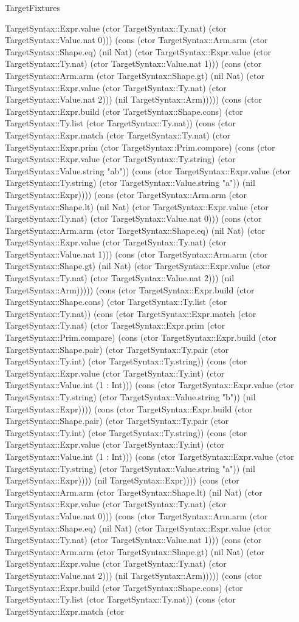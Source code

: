 \begin{lexlean}{TargetFixtures}
\begin{semanticmodule}
{TargetSyntax::Expr.value (ctor TargetSyntax::Ty.nat) (ctor TargetSyntax::Value.nat 0))) (cons (ctor TargetSyntax::Arm.arm (ctor TargetSyntax::Shape.eq) (nil Nat) (ctor TargetSyntax::Expr.value (ctor TargetSyntax::Ty.nat) (ctor TargetSyntax::Value.nat 1))) (cons (ctor TargetSyntax::Arm.arm (ctor TargetSyntax::Shape.gt) (nil Nat) (ctor TargetSyntax::Expr.value (ctor TargetSyntax::Ty.nat) (ctor TargetSyntax::Value.nat 2))) (nil TargetSyntax::Arm))))) (cons (ctor TargetSyntax::Expr.build (ctor TargetSyntax::Shape.cons) (ctor TargetSyntax::Ty.list (ctor TargetSyntax::Ty.nat)) (cons (ctor TargetSyntax::Expr.match (ctor TargetSyntax::Ty.nat) (ctor TargetSyntax::Expr.prim (ctor TargetSyntax::Prim.compare) (cons (ctor TargetSyntax::Expr.value (ctor TargetSyntax::Ty.string) (ctor TargetSyntax::Value.string "ab")) (cons (ctor TargetSyntax::Expr.value (ctor TargetSyntax::Ty.string) (ctor TargetSyntax::Value.string "a")) (nil TargetSyntax::Expr)))) (cons (ctor TargetSyntax::Arm.arm (ctor TargetSyntax::Shape.lt) (nil Nat) (ctor TargetSyntax::Expr.value (ctor TargetSyntax::Ty.nat) (ctor TargetSyntax::Value.nat 0))) (cons (ctor TargetSyntax::Arm.arm (ctor TargetSyntax::Shape.eq) (nil Nat) (ctor TargetSyntax::Expr.value (ctor TargetSyntax::Ty.nat) (ctor TargetSyntax::Value.nat 1))) (cons (ctor TargetSyntax::Arm.arm (ctor TargetSyntax::Shape.gt) (nil Nat) (ctor TargetSyntax::Expr.value (ctor TargetSyntax::Ty.nat) (ctor TargetSyntax::Value.nat 2))) (nil TargetSyntax::Arm))))) (cons (ctor TargetSyntax::Expr.build (ctor TargetSyntax::Shape.cons) (ctor TargetSyntax::Ty.list (ctor TargetSyntax::Ty.nat)) (cons (ctor TargetSyntax::Expr.match (ctor TargetSyntax::Ty.nat) (ctor TargetSyntax::Expr.prim (ctor TargetSyntax::Prim.compare) (cons (ctor TargetSyntax::Expr.build (ctor TargetSyntax::Shape.pair) (ctor TargetSyntax::Ty.pair (ctor TargetSyntax::Ty.int) (ctor TargetSyntax::Ty.string)) (cons (ctor TargetSyntax::Expr.value (ctor TargetSyntax::Ty.int) (ctor TargetSyntax::Value.int (1 : Int))) (cons (ctor TargetSyntax::Expr.value (ctor TargetSyntax::Ty.string) (ctor TargetSyntax::Value.string "b")) (nil TargetSyntax::Expr)))) (cons (ctor TargetSyntax::Expr.build (ctor TargetSyntax::Shape.pair) (ctor TargetSyntax::Ty.pair (ctor TargetSyntax::Ty.int) (ctor TargetSyntax::Ty.string)) (cons (ctor TargetSyntax::Expr.value (ctor TargetSyntax::Ty.int) (ctor TargetSyntax::Value.int (1 : Int))) (cons (ctor TargetSyntax::Expr.value (ctor TargetSyntax::Ty.string) (ctor TargetSyntax::Value.string "a")) (nil TargetSyntax::Expr)))) (nil TargetSyntax::Expr)))) (cons (ctor TargetSyntax::Arm.arm (ctor TargetSyntax::Shape.lt) (nil Nat) (ctor TargetSyntax::Expr.value (ctor TargetSyntax::Ty.nat) (ctor TargetSyntax::Value.nat 0))) (cons (ctor TargetSyntax::Arm.arm (ctor TargetSyntax::Shape.eq) (nil Nat) (ctor TargetSyntax::Expr.value (ctor TargetSyntax::Ty.nat) (ctor TargetSyntax::Value.nat 1))) (cons (ctor TargetSyntax::Arm.arm (ctor TargetSyntax::Shape.gt) (nil Nat) (ctor TargetSyntax::Expr.value (ctor TargetSyntax::Ty.nat) (ctor TargetSyntax::Value.nat 2))) (nil TargetSyntax::Arm))))) (cons (ctor TargetSyntax::Expr.build (ctor TargetSyntax::Shape.cons) (ctor TargetSyntax::Ty.list (ctor TargetSyntax::Ty.nat)) (cons (ctor TargetSyntax::Expr.match (ctor }
\end{semanticmodule}
\end{lexlean}
